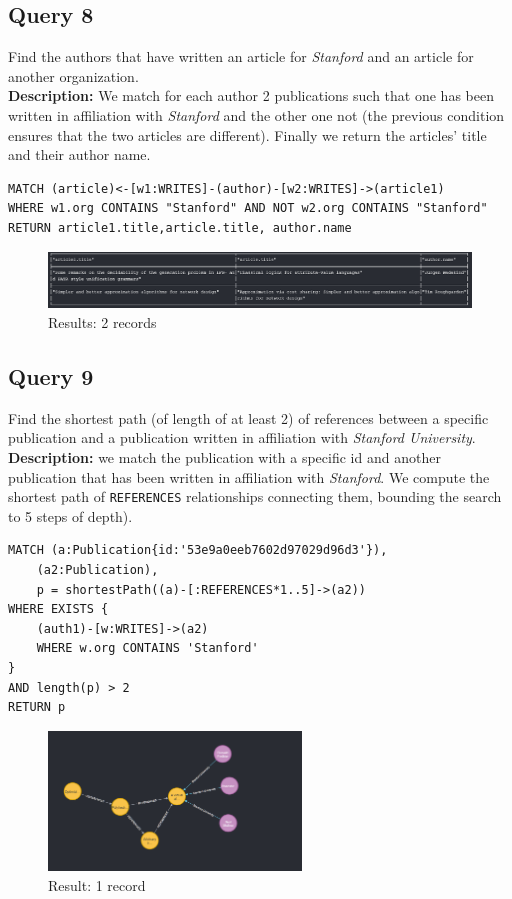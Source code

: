 \documentclass{Configuration_Files/PoliMi3i_thesis}
\begin{document}
\subsection{Query 8}
Find the authors that have written an article for \emph{Stanford} and an article for another organization.\\
\textbf{Description:} We match for each author 2 publications such that one has been written in affiliation with \emph{Stanford}
and the other one not (the previous condition ensures that the two articles are different). Finally we return the articles'
title and their author name.
\begin{lstlisting}[language=cypher, label=lst:cypher-example]
MATCH (article)<-[w1:WRITES]-(author)-[w2:WRITES]->(article1)
WHERE w1.org CONTAINS "Stanford" AND NOT w2.org CONTAINS "Stanford"
RETURN article1.title,article.title, author.name
\end{lstlisting}
\begin{figure}[H]
\centering
\includegraphics[width=1\textwidth]{query/query8.PNG}
\caption{Results: 2 records}
\label{fig:query8}
\end{figure}

\subsection{Query 9}
Find the shortest path (of length of at least 2) of references between a specific publication and a publication written in
affiliation with \emph{Stanford University}.\\
\textbf{Description:} we match the publication with a specific id and another publication that has been written in
affiliation with \emph{Stanford}. We compute the shortest path of \verb |REFERENCES| relationships connecting them, bounding
the search to 5 steps of depth).
\begin{lstlisting}[language=cypher, label=lst:cypher-example]
MATCH (a:Publication{id:'53e9a0eeb7602d97029d96d3'}),
    (a2:Publication),
    p = shortestPath((a)-[:REFERENCES*1..5]->(a2))
WHERE EXISTS {
    (auth1)-[w:WRITES]->(a2)
    WHERE w.org CONTAINS 'Stanford'
}
AND length(p) > 2
RETURN p
\end{lstlisting}
\begin{figure}[H]
\centering
\includegraphics[width=0.6\textwidth]{query/query9.PNG}
\caption{Result: 1 record}
\label{fig:query9}
\end{figure}
\end{document}
